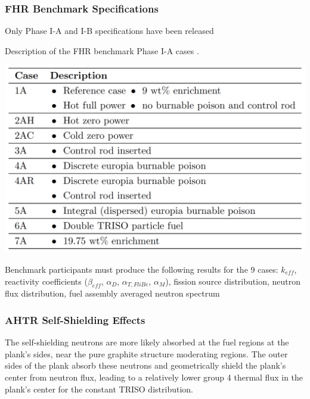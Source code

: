 \begin{frame}
    \frametitle{FHR Benchmark Specifications}
    Only Phase I-A and I-B specifications have been released 
    \begin{table}
        \caption{Description of the \acrlong{FHR} benchmark Phase I-A cases 
        \vspace{-0.25cm}
        \cite{petrovic_benchmark_2021}.}
        \includegraphics[width=0.8\linewidth]{figures/benchmark-cases.png} 
    \end{table}
    Benchmark participants must produce the following results for 
    the 9 cases: $k_{eff}$, reactivity coefficients ($\beta_{eff}$, 
    $\alpha_D$, $\alpha_{T, FliBe}$, $\alpha_M$), fission source distribution, 
    neutron flux distribution, fuel assembly averaged neutron spectrum
\end{frame}

\begin{frame}
    \frametitle{AHTR Self-Shielding Effects}
    The self-shielding neutrons are more likely absorbed at the fuel regions at the 
    plank's sides, near the pure graphite structure moderating regions. 
    The outer sides of the plank absorb these neutrons and geometrically shield the 
    plank's center from neutron flux, leading to a relatively lower group 4 thermal 
    flux in the plank's center for the constant TRISO distribution. 
\end{frame}

